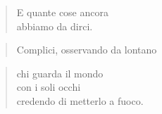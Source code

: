 
\begin{verse}
    E quante cose ancora\\
    abbiamo da dirci.\\
    \end{verse}
    \vspace{-0.9cm}
    \begin{verse}
        Complici, osservando \hfill da lontano
    \end{verse}

    \vspace{-0.9cm}
\begin{verse}
    chi guarda il mondo\\
    con i soli occhi\\
    credendo di metterlo a fuoco.
\end{verse}
